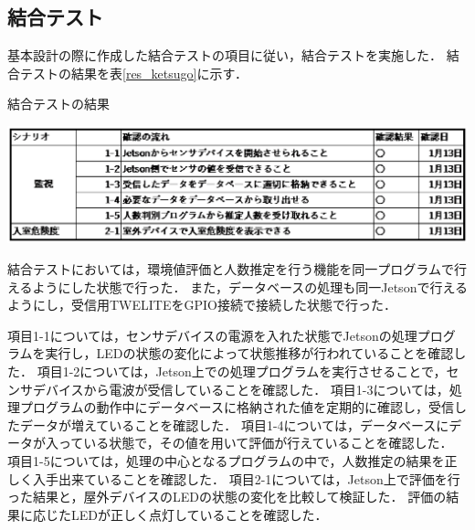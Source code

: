 \subsection{結合テスト}
基本設計の際に作成した結合テストの項目に従い，結合テストを実施した．
結合テストの結果を表\ref{res_ketsugo}に示す．
\begin{table}[htbp]
    \centering
    \caption{結合テストの結果}
    \label{res_ketsugo}
    \includegraphics[width = 15cm]{./picture/ketugoutest.eps}
\end{table}

結合テストにおいては，環境値評価と人数推定を行う機能を同一プログラムで行えるようにした状態で行った．
また，データベースの処理も同一Jetsonで行えるようにし，受信用TWELITEをGPIO接続で接続した状態で行った．

項目1-1については，センサデバイスの電源を入れた状態でJetsonの処理プログラムを実行し，LEDの状態の変化によって状態推移が行われていることを確認した．
項目1-2については，Jetson上での処理プログラムを実行させることで，センサデバイスから電波が受信していることを確認した．
項目1-3については，処理プログラムの動作中にデータベースに格納された値を定期的に確認し，受信したデータが増えていることを確認した．
項目1-4については，データベースにデータが入っている状態で，その値を用いて評価が行えていることを確認した．
項目1-5については，処理の中心となるプログラムの中で，人数推定の結果を正しく入手出来ていることを確認した．
項目2-1については，Jetson上で評価を行った結果と，屋外デバイスのLEDの状態の変化を比較して検証した．
評価の結果に応じたLEDが正しく点灯していることを確認した．





